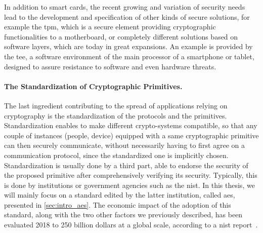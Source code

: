 In addition to smart cards, the recent growing and variation of security needs lead to the development and specification of other kinds of secure solutions, for example the \gls{tpm}, which is a secure element providing cryptographic functionalities to a motherboard, or completely different solutions based on software layers, which are today in great expansions.
An example is provided by the \gls{tee}, a software environment of the main processor of a smartphone or tablet, designed to assure resistance to software and even hardware threats.

\paragraph{The Standardization of Cryptographic Primitives.}
The last ingredient contributing to the spread of applications relying on \gls{cryptography} is the standardization of the protocols and the primitives.
Standardization enables to make different crypto-systems compatible, so that any couple of instances (people, device) equipped with a same cryptographic primitive can then securely communicate, without necessarily having to first agree on a communication protocol, since the standardized one is implicitly chosen.
Standardization is usually done by a third part, able to endorse the security of the proposed primitive after comprehensively verifying its security.
Typically, this is done by institutions or government agencies such as the \gls{nist}.
In this thesis, we will mainly focus on a standard edited by the latter institution, called \gls{aes}, presented in \autoref{sec:intro_aes}.
The economic impact of the adoption of this standard, along with the two other factors we previously described, has been evaluated 2018 to 250 billion dollars at a global scale, according to a \gls{nist} report~\cite{nist_eco_impact_2018}.

